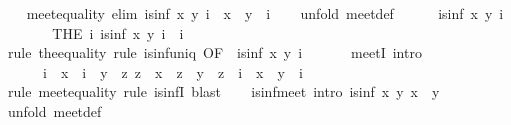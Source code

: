 \begin{isabellebody}
%
\isadeliminvisible
\isanewline
\ \ %
\endisadeliminvisible
%
\isataginvisible
{}\isamarkupfalse%
\ meet{\isacharunderscore}equality\ {\isacharbrackleft}elim{\isacharquery}{\isacharbrackright}{\isacharcolon}\ {\isachardoublequoteopen}is{\isacharunderscore}inf\ x\ y\ i\ {\isasymLongrightarrow}\ x\ {\isasymsqinter}\ y\ {\isacharequal}\ i{\isachardoublequoteclose}\isanewline
\ \ \isamarkupfalse%
\ {\isacharparenleft}unfold\ meet{\isacharunderscore}def{\isacharparenright}\isanewline
\ \ \ \ \isamarkupfalse%
\ {\isachardoublequoteopen}is{\isacharunderscore}inf\ x\ y\ i{\isachardoublequoteclose}\isanewline
\ \ \ \ \isamarkupfalse%
\ \isamarkupfalse%
\ {\isachardoublequoteopen}{\isacharparenleft}THE\ i{\isachardot}\ is{\isacharunderscore}inf\ x\ y\ i{\isacharparenright}\ {\isacharequal}\ i{\isachardoublequoteclose}\isanewline
\ \ \ \ \ \ \isamarkupfalse%
\ {\isacharparenleft}rule\ the{\isacharunderscore}equality{\isacharparenright}\ {\isacharparenleft}rule\ is{\isacharunderscore}inf{\isacharunderscore}uniq\ {\isacharbrackleft}OF\ {\isacharunderscore}\ {\isacharbackquoteopen}is{\isacharunderscore}inf\ x\ y\ i{\isacharbackquoteclose}{\isacharbrackright}{\isacharparenright}\isanewline
\ \ \isamarkupfalse%
\isanewline
\isanewline
\ \ \isamarkupfalse%
\ meetI\ {\isacharbrackleft}intro{\isacharquery}{\isacharbrackright}{\isacharcolon}\isanewline
\ \ \ \ \ \ {\isachardoublequoteopen}i\ {\isasymsqsubseteq}\ x\ {\isasymLongrightarrow}\ i\ {\isasymsqsubseteq}\ y\ {\isasymLongrightarrow}\ {\isacharparenleft}{\isasymAnd}z{\isachardot}\ z\ {\isasymsqsubseteq}\ x\ {\isasymLongrightarrow}\ z\ {\isasymsqsubseteq}\ y\ {\isasymLongrightarrow}\ z\ {\isasymsqsubseteq}\ i{\isacharparenright}\ {\isasymLongrightarrow}\ x\ {\isasymsqinter}\ y\ {\isacharequal}\ i{\isachardoublequoteclose}\isanewline
\ \ \ \ \isamarkupfalse%
\ {\isacharparenleft}rule\ meet{\isacharunderscore}equality{\isacharcomma}\ rule\ is{\isacharunderscore}infI{\isacharparenright}\ blast{\isacharplus}\isanewline
\isanewline
\ \ \isamarkupfalse%
\ is{\isacharunderscore}inf{\isacharunderscore}meet\ {\isacharbrackleft}intro{\isacharquery}{\isacharbrackright}{\isacharcolon}\ {\isachardoublequoteopen}is{\isacharunderscore}inf\ x\ y\ {\isacharparenleft}x\ {\isasymsqinter}\ y{\isacharparenright}{\isachardoublequoteclose}\isanewline
\ \ \isamarkupfalse%
\ {\isacharparenleft}unfold\ meet{\isacharunderscore}def{\isacharparenright}\isanewline

\end{isabellebody}
